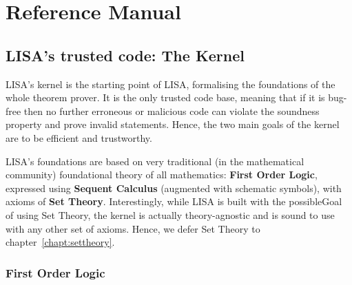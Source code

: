 \newcommand\Var{\operatorname{Var}}
\newcommand\FormulaVar{\operatorname{FormulaVar}}
\newcommand\List{\operatorname{List}}
\newcommand\Lambdaa{\operatorname{Lambda}}
\newcommand\LambdaTT{\operatorname{LambdaTermTerm}}
\newcommand\LambdaTF{\operatorname{LambdaTermFormula}}
\newcommand\LambdaFF{\operatorname{LambdaFormulaFormula}}

\part{Reference Manual}
\label{part:manual}
\chapter{LISA's trusted code: The Kernel}
\label{chapt:kernel}
LISA's kernel is the starting point of LISA, formalising the foundations of the whole theorem prover. It is the only trusted code base, meaning that if it is bug-free then no further erroneous or malicious code can violate the soundness property and prove invalid statements. Hence, the two main goals of the kernel are to be efficient and trustworthy.


LISA's foundations are based on very traditional (in the mathematical community) foundational theory of all mathematics: \textbf{First Order Logic}, expressed using \textbf{Sequent Calculus} (augmented with schematic symbols), with axioms of \textbf{Set Theory}.
Interestingly, while LISA is built with the possibleGoal of using Set Theory, the kernel is actually theory-agnostic and is sound to use with any other set of axioms. Hence, we defer Set Theory to chapter~\ref{chapt:settheory}.

\section{First Order Logic}
\label{sect:FOL}
